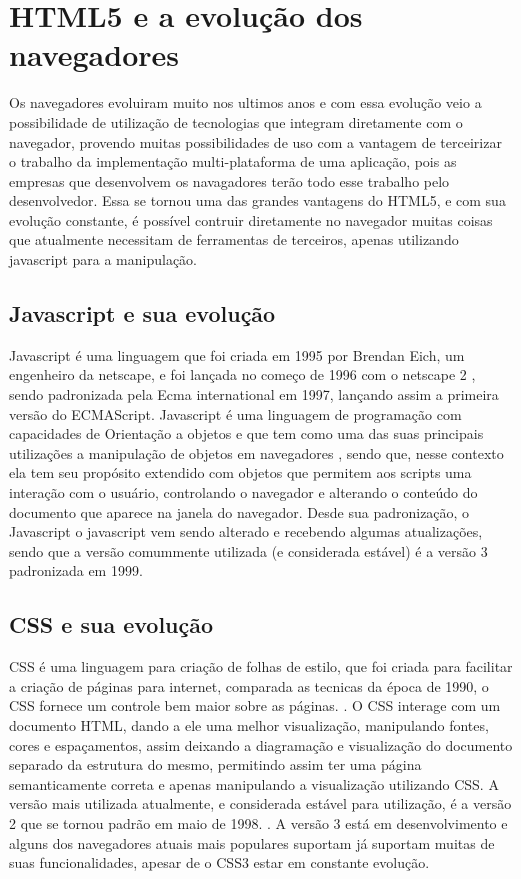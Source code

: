 \section{HTML5 e a evolução dos navegadores}

Os navegadores evoluiram muito nos ultimos anos e com essa evolução
veio a possibilidade de utilização de tecnologias que integram
diretamente com o navegador, provendo muitas possibilidades de uso com
a vantagem de terceirizar o trabalho da implementação multi-plataforma
de uma aplicação, pois as empresas que desenvolvem os navagadores
terão todo esse trabalho pelo desenvolvedor. Essa se tornou uma das
grandes vantagens do HTML5, e com sua evolução constante, é possível
contruir diretamente no navegador muitas coisas que atualmente necessitam
de ferramentas de terceiros, apenas utilizando javascript para a
manipulação.

\subsection{Javascript e sua evolução}

Javascript é uma linguagem que foi criada em 1995 por Brendan Eich,
um engenheiro da netscape, e foi lançada no começo de 1996 com o
netscape 2 \cite{mdnjavascript}, sendo padronizada pela Ecma
international em 1997, lançando assim a primeira versão do ECMAScript.
Javascript é uma linguagem de programação com capacidades de Orientação a objetos e que tem como uma das suas principais
utilizações a manipulação de objetos em navegadores \cite{flanagan2006javascript}, sendo que, nesse contexto
ela tem seu propósito extendido com objetos que permitem aos scripts uma interação com o usuário,
controlando o navegador e alterando o conteúdo do documento que aparece na janela do navegador.
Desde sua padronização, o Javascript o javascript vem sendo alterado e
recebendo algumas atualizações, sendo que a versão comummente
utilizada (e considerada estável) é a versão 3 padronizada em 1999.

\subsection{CSS e sua evolução}

CSS é uma linguagem para criação de folhas de estilo, que foi criada
para facilitar a criação de páginas para internet, comparada as tecnicas da época de
1990, o CSS fornece um controle bem maior sobre as páginas. \cite{schmitt2009css}.
O CSS interage com um documento HTML, dando a ele uma melhor visualização, manipulando
fontes, cores e espaçamentos, assim deixando a diagramação e visualização do documento
separado da estrutura do mesmo, permitindo assim ter uma página semanticamente correta
e apenas manipulando a visualização utilizando CSS.
A versão mais utilizada atualmente, e considerada estável para utilização, é a versão 2
que se tornou padrão em maio de 1998. \cite{zeldman2009designing}.
A versão 3 está em desenvolvimento e alguns dos navegadores atuais mais populares suportam
já suportam muitas de suas funcionalidades, apesar de o CSS3 estar em constante evolução.

